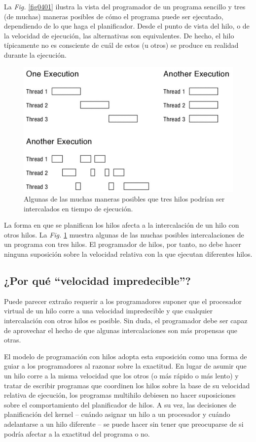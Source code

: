 \documentclass[10pt]{book}
\begin{document}
La \textit{Fig.} \ref{fig0401} ilustra la vista del programador de un programa sencillo y tres (de muchas) maneras posibles de cómo el programa puede ser ejecutado, dependiendo de lo que haga el planificador. Desde el punto de vista del hilo, o de la velocidad de ejecución, las alternativas son equivalentes. De hecho, el hilo típicamente no es consciente de cuál de estos (u otros) se produce en realidad durante la ejecución.

\begin{figure}[tbhp]
\centerline{\includegraphics[scale=0.55]{img/fig0402}}
\caption{Algunas de las muchas maneras posibles que tres hilos podrían ser intercalados en tiempo de ejecución.}
\label{fig0402}
\end{figure}

La forma en que se planifican los hilos afecta a la intercalación de un hilo con otros hilos. La \textit{Fig.} \ref{fig0402} muestra algunas de las muchas posibles intercalaciones de un programa con tres hilos. El programador de hilos, por tanto, no debe hacer ninguna suposición sobre la velocidad relativa con la que ejecutan diferentes hilos.

\subsection{¿Por qué ``velocidad impredecible''?}
Puede parecer extraño requerir a los programadores suponer que el procesador virtual de un hilo corre a una velocidad impredecible y que cualquier intercalación con otros hilos es posible. Sin duda, el programador debe ser capaz de aprovechar el hecho de que algunas intercalaciones son más propensas que otras.

El modelo de programación con hilos adopta esta suposición como una forma de guiar a los programadores al razonar sobre la exactitud. En lugar de asumir que un hilo corre a la misma velocidad que los otros (o más rápido o más lento) y tratar de escribir programas que coordinen los hilos sobre la base de su velocidad relativa de ejecución, los programas multihilo debiesen no hacer suposiciones sobre el comportamiento del planificador de hilos. A su vez, las decisiones de planificación del kernel -- cuándo asignar un hilo a un procesador y cuándo adelantarse a un hilo diferente -- se puede hacer sin tener que preocuparse de si podría afectar a la exactitud del programa o no.
\end{document}
